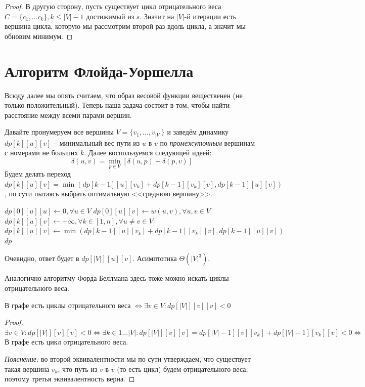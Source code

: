 \begin{proof}
    В другую сторону, пусть существует цикл отрицательного веса $C = \{c_1, \dots c_k\}, k \leq |V| - 1$ достижимый из $s$. Значит на $|V|$-й итерации есть вершина цикла, которую мы рассмотрим второй раз вдоль цикла, а значит мы обновим минимум.
\end{proof}

\section{Алгоритм Флойда-Уоршелла}

Всюду далее мы опять считаем, что образ весовой функции вещественен (не только положительный). Теперь наша задача состоит в том, чтобы найти расстояние между всеми парами вершин.

Давайте пронумеруем все вершины $V = \{v_1, \dots, v_{|V|}\}$ и заведём динамику $dp[k][u][v]$ -- минимальный вес пути из $u$ в $v$ по \textit{промежуточным} вершинам с номерами не больших $k$.
Далее воспользуемся следующей идеей:
\begin{equation*}
    \delta(u, v) = \min\limits_{p \in V} [\delta(u, p) + \delta(p, v)]
\end{equation*}
Будем делать переход $dp[k][u][v] = \min(dp[k - 1][u][v_k] + dp[k - 1][v_k][v], dp[k - 1][u][v])$, по сути пытаясь выбрать оптимальную <<среднюю вершину>>.

\begin{algorithm}[H]
\caption{Алгоритм Флойда-Уоршелла}
\begin{algorithmic}[1]

    \State $dp[0][u][u] \gets 0, \forall u \in V$
    \State $dp[0][u][v] \gets w(u, v), \forall u, v \in V$
    \State $dp[k][u][v] \gets +\infty, \forall k \in [1, n], \forall u \neq v \in V$
                \State $dp[k][u][v] \gets \min(dp[k - 1][u][v_k] + dp[k - 1][v_k][v], dp[k - 1][u][v])$
            \EndFor
        \EndFor
    \EndFor
    \State \Return $dp$
\EndFunction
\end{algorithmic}
\end{algorithm}
Очевидно, ответ будет в $dp[|V|][u][v]$. Асимптотика $\Theta\left(|V|^3\right)$.

Аналогично алгоритму Форда-Беллмана здесь тоже можно искать циклы отрицательного веса.

\Th В графе есть циклы отрицательного веса $\iff \exists v \in V: dp[|V|][v][v] < 0$
\begin{proof}
    $\exists v \in V: dp[|V|][v][v] < 0 \iff \exists k \in 1 \dots |V|: dp[|V|][v][v] = dp[|V| - 1][v][v_k] + dp[|V| - 1][v_k][v] < 0 \iff$ В графе есть цикл отрицательного веса.

    \textit{Пояснение:} во второй эквивалентности мы по сути утверждаем, что существует такая вершина $v_k$, что путь из $v$ в $v$ (то есть цикл) будем отрицательного веса, поэтому третья эквивалентность верна.
\end{proof}
